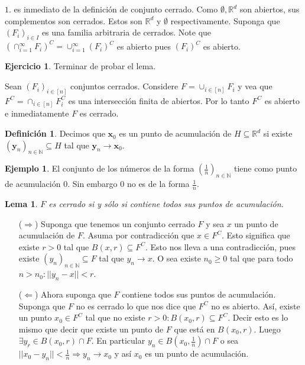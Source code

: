 \documentclass[12pt]{article}
\theoremstyle{plain}
\newtheorem{Lem}[Th]{Lema}             %
\theoremstyle{definition}
\newtheorem{Def}[Th]{Definición}       %
\newtheorem{Ex}[Th]{Ejemplo}               %
\newtheorem{Ej}[Th]{Ejercicio}
\theoremstyle{remark}
\numberwithin{equation}{section}
\newcommand{\bN}{\mathbb{N}}        %
\newcommand{\bR}{\mathbb{R}}        %
\renewcommand{\geq}{\geqslant}      %
\renewcommand{\:}{\colon}           %
\renewcommand{\vec}[1]{\mathbf{#1}}
\newcommand{\vx}{\vec{x}}           %
\newcommand{\vy}{\vec{y}}
\newcommand{\bonj}[1]{\left\lbrack#1\right\rbrack}
\begin{document}
\begin{multicols}{2}
\begin{ptcbp}
$\mathit{1}.$ es inmediato de la definición de conjunto cerrado. Como $\emptyset,\bR^d$ son abiertos, sus complementos son cerrados. Estos son $\bR^d$ y $\emptyset$ respectivamente.
Suponga que $(F_i)_{i\in I}$ es una familia arbitraria de cerrados. Note que $\left(\cap_{i=1}^\infty F_i\right)^C=\cup_{i=1}^\infty (F_i)^C$ es abierto pues $(F_i)^C$ es abierto.
\end{ptcbp}

\begin{Ej}
  Terminar de probar el lema.
\end{Ej}

\begin{ptcb}
Sean $(F_i)_{i\in\bonj{n}}$ conjuntos cerrados. Considere $F=\cup_{i\in\bonj{n}}F_i$ y vea que $F^C=\cap_{i\in\bonj{n}}F_i^C$ es una intersección finita de abiertos. Por lo tanto $F^C$ es abierto e inmediatamente $F$ es cerrado.
\end{ptcb}

\begin{Def}
Decimos que $\vx_0$ es un punto de acumulación de $H\subseteq \bR^d$ si existe $(\vy_n)_{n\in\bN}\subseteq H$ tal que $\vy_n\to \vx_0$.
\end{Def}

\begin{Ex}
  El conjunto de los números de la forma $\left(\frac{1}{n}\right)_{n\in\bN}$ tiene como punto de acumulación $0$. Sin embargo $0$ no es de la forma $\frac{1}{n}$.
\end{Ex}


\begin{Lem}
  $F$ es cerrado si y sólo si contiene todos sus puntos de acumulación.
\end{Lem}
\begin{ptcbp}
\begin{enumerate}
  \item[($\Rightarrow$)] Suponga que tenemos un conjunto cerrado $F$ y sea $x$ un punto de acumulación de $F$. Asuma por contradicción que $x\in F^C$. Esto significa que existe $r>0$ tal que $B(x,r)\subseteq F^C$. Esto nos lleva a una contradicción, pues existe $(y_n)_{n\in\bN}\subseteq F$ tal que $y_n\to x$. O sea existe $n_0\geq 0$ tal que para todo $n>n_0: ||y_n-x||< r$.\par
  \item[($\Leftarrow$)] Ahora suponga que $F$ contiene todos sus puntos de acumulación. Suponga que $F$ no es cerrado lo que nos dice que $F^C$ no es abierto. Así, existe un punto $x_0\in F^C$ tal que no existe $r>0: B(x_0,r)\subseteq F^C$. Decir esto es lo mismo que decir que existe un punto de $F$ que está en $B(x_0,r)$. Luego $\exists y_r\in B(x_0,r)\cap F$. En particular $y_n\in B(x_0,\frac{1}{n})\cap F$ o sea $||x_0-y_n||<\frac{1}{n}\Rightarrow y_n\to x_0$ y así $x_0$ es un punto de acumulación.
\end{enumerate}




\end{ptcbp}
\end{multicols}
\end{document}
